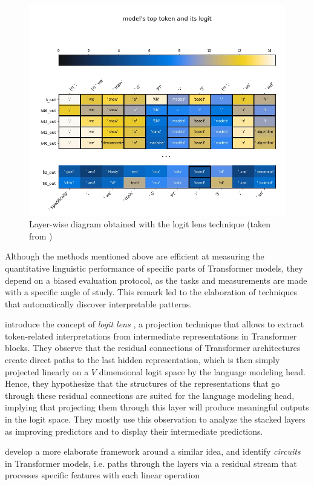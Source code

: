\begin{figure}[ht]
    \centering
    \includegraphics[width=0.7\linewidth]{sources/related_works/imgs/logit_lens.pdf}
    \caption{Layer-wise diagram obtained with the logit lens technique (taken from \citet{logit_lens})}
    \label{fig:logit_lens}
\end{figure}

Although the methods mentioned above are efficient at measuring the quantitative linguistic performance of specific parts of Transformer models, they depend on a biased evaluation protocol, as the tasks and measurements are made with a specific angle of study. This remark led to the elaboration of techniques that automatically discover interpretable patterns.

\citet{logit_lens} introduce the concept of \textit{logit lens} \citep{logit_lens}, a projection technique that allows to extract token-related interpretations from intermediate representations in Transformer blocks. They observe that the residual connections of Transformer architectures create direct paths to the last hidden representation, which is then simply projected linearly on a $V$ dimensional logit space by the language modeling head. Hence, they hypothesize that the structures of the representations that go through these residual connections are suited for the language modeling head, implying that projecting them through this layer will produce meaningful outputs in the logit space. They mostly use this observation to analyze the stacked layers as improving predictors and to display their intermediate predictions.

\citet{elhage2021mathematical} develop a more elaborate framework around a similar idea, and identify \textit{circuits} in Transformer models, i.e. paths through the layers via a residual stream that processes specific features with each linear operation

